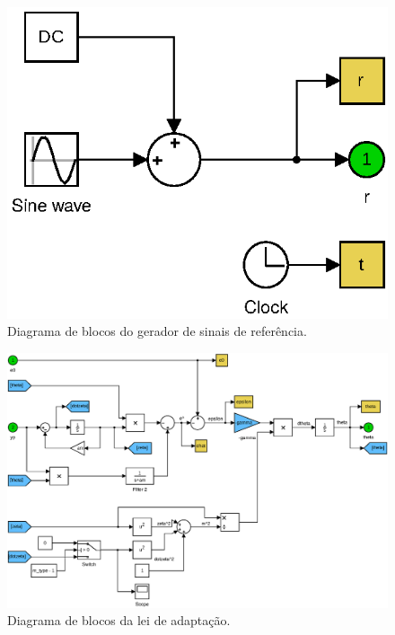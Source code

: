 \bigskip%
\begin{figure}[H]
  \centering
  \includegraphics[scale=0.8]{figs/blocks/reference-signal.eps}
  \caption{Diagrama de blocos do gerador de sinais de referência.}
\end{figure}

\bigskip%
\begin{figure}[H]
  \centering
  \includegraphics[width=16cm]{figs/blocks/adaptation.eps}
  \caption{Diagrama de blocos da lei de adaptação.}
\end{figure}